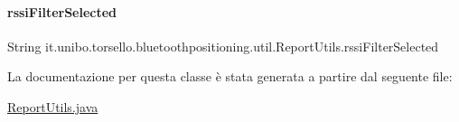 \paragraph{\texorpdfstring{rssi\+Filter\+Selected}{rssiFilterSelected}}
{\footnotesize\ttfamily String it.\+unibo.\+torsello.\+bluetoothpositioning.\+util.\+Report\+Utils.\+rssi\+Filter\+Selected\hspace{0.3cm}{\ttfamily [private]}}



La documentazione per questa classe è stata generata a partire dal seguente file\+:\begin{DoxyCompactItemize}
\item 
\hyperlink{ReportUtils_8java}{Report\+Utils.\+java}\end{DoxyCompactItemize}
